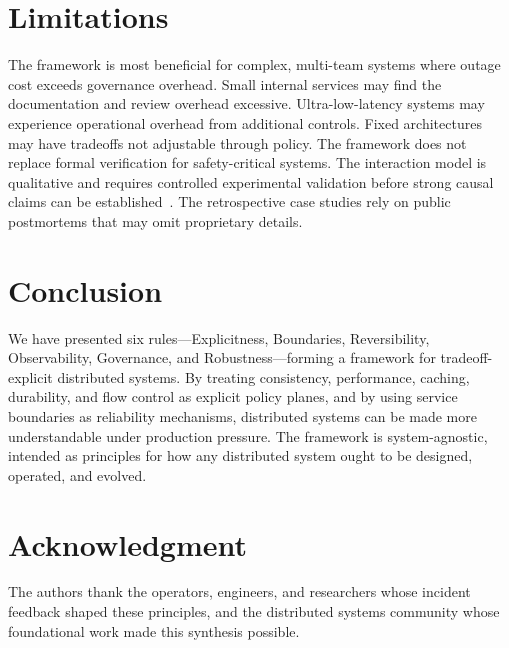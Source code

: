 \documentclass[conference]{IEEEtran}
\begin{document}
\section{Limitations}

The framework is most beneficial for complex, multi-team systems where outage cost exceeds governance overhead. Small internal services may find the documentation and review overhead excessive. Ultra-low-latency systems may experience operational overhead from additional controls. Fixed architectures may have tradeoffs not adjustable through policy. The framework does not replace formal verification for safety-critical systems. The interaction model is qualitative and requires controlled experimental validation before strong causal claims can be established~\cite{gherghe2025framework}. The retrospective case studies rely on public postmortems that may omit proprietary details.

\section{Conclusion}

We have presented six rules---Explicitness, Boundaries, Reversibility, Observability, Governance, and Robustness---forming a framework for tradeoff-explicit distributed systems. By treating consistency, performance, caching, durability, and flow control as explicit policy planes, and by using service boundaries as reliability mechanisms, distributed systems can be made more understandable under production pressure. The framework is system-agnostic, intended as principles for how any distributed system ought to be designed, operated, and evolved.

\section*{Acknowledgment}

The authors thank the operators, engineers, and researchers whose incident feedback shaped these principles, and the distributed systems community whose foundational work made this synthesis possible.
\end{document}
